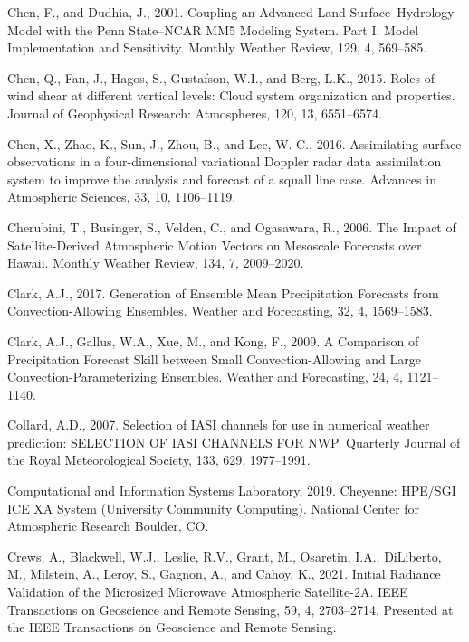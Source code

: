 \documentclass[12pt,oneside,a4paper]{reedthesis}
\begin{document}
\leavevmode\hypertarget{ref-chen2001}{}%
Chen, F., and Dudhia, J., 2001. Coupling an Advanced Land Surface--Hydrology Model with the Penn State--NCAR MM5 Modeling System. Part I: Model Implementation and Sensitivity. Monthly Weather Review, 129, 4, 569--585.

\leavevmode\hypertarget{ref-chen2015}{}%
Chen, Q., Fan, J., Hagos, S., Gustafson, W.I., and Berg, L.K., 2015. Roles of wind shear at different vertical levels: Cloud system organization and properties. Journal of Geophysical Research: Atmospheres, 120, 13, 6551--6574.

\leavevmode\hypertarget{ref-chen2016}{}%
Chen, X., Zhao, K., Sun, J., Zhou, B., and Lee, W.-C., 2016. Assimilating surface observations in a four-dimensional variational Doppler radar data assimilation system to improve the analysis and forecast of a squall line case. Advances in Atmospheric Sciences, 33, 10, 1106--1119.

\leavevmode\hypertarget{ref-cherubini2006}{}%
Cherubini, T., Businger, S., Velden, C., and Ogasawara, R., 2006. The Impact of Satellite-Derived Atmospheric Motion Vectors on Mesoscale Forecasts over Hawaii. Monthly Weather Review, 134, 7, 2009--2020.

\leavevmode\hypertarget{ref-clark2017}{}%
Clark, A.J., 2017. Generation of Ensemble Mean Precipitation Forecasts from Convection-Allowing Ensembles. Weather and Forecasting, 32, 4, 1569--1583.

\leavevmode\hypertarget{ref-clark2009}{}%
Clark, A.J., Gallus, W.A., Xue, M., and Kong, F., 2009. A Comparison of Precipitation Forecast Skill between Small Convection-Allowing and Large Convection-Parameterizing Ensembles. Weather and Forecasting, 24, 4, 1121--1140.

\leavevmode\hypertarget{ref-collard2007}{}%
Collard, A.D., 2007. Selection of IASI channels for use in numerical weather prediction: SELECTION OF IASI CHANNELS FOR NWP. Quarterly Journal of the Royal Meteorological Society, 133, 629, 1977--1991.

\leavevmode\hypertarget{ref-Cheyenne2019}{}%
Computational and Information Systems Laboratory, 2019. Cheyenne: HPE/SGI ICE XA System (University Community Computing). National Center for Atmospheric Research Boulder, CO.

\leavevmode\hypertarget{ref-crews2021}{}%
Crews, A., Blackwell, W.J., Leslie, R.V., Grant, M., Osaretin, I.A., DiLiberto, M., Milstein, A., Leroy, S., Gagnon, A., and Cahoy, K., 2021. Initial Radiance Validation of the Microsized Microwave Atmospheric Satellite-2A. IEEE Transactions on Geoscience and Remote Sensing, 59, 4, 2703--2714. Presented at the IEEE Transactions on Geoscience and Remote Sensing.
\end{document}
